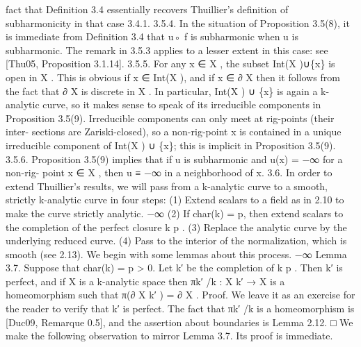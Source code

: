 \documentclass[
  10pt,
]{article}
\newenvironment{Shaded}{}{}
\newcommand{\NormalTok}[1]{#1}
\begin{document}
\begin{Shaded}
\begin{Highlighting}[]
\NormalTok{fact that Definition 3.4 essentially recovers Thuillier’s definition of subharmonicity in that}
\NormalTok{case 3.4.1.}
\NormalTok{3.5.4. In the situation of Proposition 3.5(8), it is immediate from Definition 3.4 that u◦ f}
\NormalTok{is subharmonic when u is subharmonic. The remark in 3.5.3 applies to a lesser extent in}
\NormalTok{this case: see [Thu05, Proposition 3.1.14].}
\NormalTok{3.5.5. For any x ∈ X , the subset Int(X )∪\{x\} is open in X . This is obvious if x ∈ Int(X ), and}
\NormalTok{if x ∈ ∂ X then it follows from the fact that ∂ X is discrete in X . In particular, Int(X ) ∪ \{x\}}
\NormalTok{is again a k{-}analytic curve, so it makes sense to speak of its irreducible components}
\NormalTok{in Proposition 3.5(9). Irreducible components can only meet at rig{-}points (their inter{-}}
\NormalTok{sections are Zariski{-}closed), so a non{-}rig{-}point x is contained in a unique irreducible}
\NormalTok{component of Int(X ) ∪ \{x\}; this is implicit in Proposition 3.5(9).}
\NormalTok{3.5.6. Proposition 3.5(9) implies that if u is subharmonic and u(x) = −∞ for a non{-}rig{-}}
\NormalTok{point x ∈ X , then u ≡ −∞ in a neighborhood of x.}
\NormalTok{3.6. In order to extend Thuillier’s results, we will pass from a k{-}analytic curve to a}
\NormalTok{smooth, strictly k{-}analytic curve in four steps:}
\NormalTok{      (1) Extend scalars to a field as in 2.10 to make the curve strictly analytic.}
\NormalTok{                                                                                          −∞}
\NormalTok{      (2) If char(k) = p, then extend scalars to the completion of the perfect closure k p .}
\NormalTok{      (3) Replace the analytic curve by the underlying reduced curve.}
\NormalTok{      (4) Pass to the interior of the normalization, which is smooth (see 2.13).}
\NormalTok{We begin with some lemmas about this process.}
\NormalTok{                                                                                 −∞}
\NormalTok{Lemma 3.7. Suppose that char(k) = p \textgreater{} 0. Let k′ be the completion of k p . Then k′ is}
\NormalTok{perfect, and if X is a k{-}analytic space then πk′ /k : X k′ → X is a homeomorphism such that}
\NormalTok{π(∂ X k′ ) = ∂ X .}
\NormalTok{Proof. We leave it as an exercise for the reader to verify that k′ is perfect. The fact that}
\NormalTok{πk′ /k is a homeomorphism is [Duc09, Remarque 0.5], and the assertion about boundaries}
\NormalTok{is Lemma 2.12.                                                                            □}
\NormalTok{     We make the following observation to mirror Lemma 3.7. Its proof is immediate.}

\end{Highlighting}
\end{Shaded}
\end{document}
